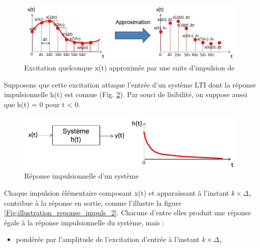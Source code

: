 \begin{remark}{}
	\begin{figure}[htbp]
          \centering
          \includegraphics[scale=0.5]{images/Approx_excitation_Dirac.jpg}
          \caption{Excitation quelconque x(t) approximée par une suite
            d'impulsion de \Dirac}
          \label{Fig:Approx_excitation_Dirac}
	\end{figure}
	Supposons que cette excitation attaque l'entrée d'un système
        LTI dont la réponse impulsionnelle h(t) est connue
        (Fig. \ref{Fig:reponse_impuls_illustration}). Par souci de
        lisibilité, on suppose aussi que h(t) = 0 pour t < 0.
	\begin{figure}[htbp]
          \centering
          \includegraphics[scale=0.5]{images/reponse_impuls_illustration.jpg}
          \caption{Réponse impulsionnelle d'un système}
          \label{Fig:reponse_impuls_illustration}
	\end{figure}
	
	Chaque impulsion élémentaire composant x(t) et apparaissant à
        l'instant $ k \times \Delta_\tau $ contribue à la réponse en
        sortie, comme l'illustre la figure
        \ref{Fig:illustration_reponse_impuls_2}. Chacune d'entre elles
        produit une réponse égale à la réponse impulsionnelle du
        système, mais :
	
	\begin{itemize}
        \item pondérée par l'amplitude de l'excitation d'entrée à
          l'instant $ k \times \Delta_\tau $
	

\end{itemize}
\end{remark}

